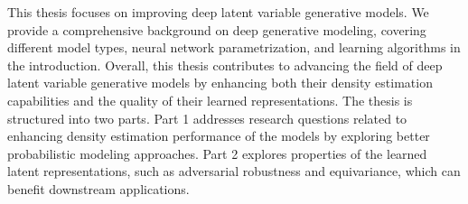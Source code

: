 \begin{abstractpage}

This thesis focuses on improving deep latent variable generative models.
We provide a comprehensive background on deep generative modeling, covering different model types, neural network parametrization, and learning algorithms in the introduction. 
Overall, this thesis contributes to advancing the field of deep latent variable generative models by enhancing both their density estimation capabilities and the quality of their learned representations.
The thesis is structured into two parts. 
Part 1 addresses research questions related to enhancing density estimation performance of the models by exploring better probabilistic modeling approaches.
Part 2 explores properties of the learned latent representations, such as adversarial robustness and equivariance, which can benefit downstream applications.




\end{abstractpage}



